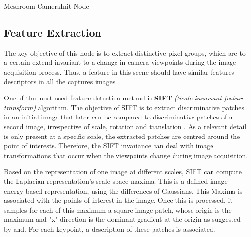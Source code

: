 \documentclass[12pt]{report}
\begin{document}
\begin{table}[H]
  \centering
  \caption{Meshroom CameraInit Node }
  \label{tab:CameraInit}
  \end{table}
  



\newpage
  \subsection{Feature Extraction}
  The key objective of this node is to extract distinctive pixel groups, which are to a certain extend invariant to a change in camera viewpoints during the image acquisition process.
  Thus, a feature in this scene should have similar features descriptors in all the captures images.
  
  One of the most used feature detection method is \textbf{SIFT} \textit{(Scale-invariant feature transform)} algorithm. 
  The objective of SIFT is to extract discriminative patches in an initial image that later can be compared to discriminative patches of a second image, irrespective of scale, rotation and translation .
  As a relevant detail is only present at a specific scale, the extracted patches are centred around the point of interests. 
  Therefore, the SIFT invariance can deal with image transformations that occur when the viewpoints change during image acquisition.
  
  Based on the representation of one image at different scales, SIFT can compute the  Laplacian representation's scale-space maxima. This is a defined image energy-based representation, using the differences of Gaussians.
  This Maxima is associated with the points of interest in the image. 
  Once this is processed, it samples for each of this maximum a square image patch, whose origin is the maximum and "x" direction is the dominant gradient at the origin as suggested by  and.
  For each keypoint, a description of these patches is associated. 
  
\end{document}
